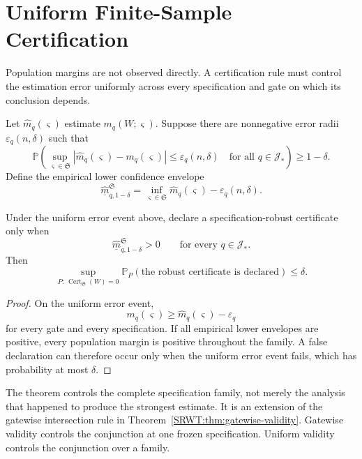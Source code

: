 \section{Uniform Finite-Sample Certification}

Population margins are not observed directly. A certification rule must
control the estimation error uniformly across every specification and gate on
which its conclusion depends.

Let \(\widehat m_q(\varsigma)\) estimate
\(m_q(W;\varsigma)\). Suppose there are nonnegative error radii
\(\varepsilon_q(n,\delta)\) such that
\[
\mathbb P\left(
\sup_{\varsigma\in\mathfrak S}
\left|
\widehat m_q(\varsigma)-m_q(\varsigma)
\right|
\leq
\varepsilon_q(n,\delta)
\quad\text{for all }q\in\mathcal J_*
\right)
\geq1-\delta.
\]
Define the empirical lower confidence envelope
\[
\boxed{
\widehat{\underline m}_{q,1-\delta}^{\mathfrak S}
=
\inf_{\varsigma\in\mathfrak S}
\widehat m_q(\varsigma)
-
\varepsilon_q(n,\delta).
}
\]


\begin{SRWTtheorem}
\label{SRWT:thm:uniform-spec-certification}
Under the uniform error event above, declare a specification-robust certificate
only when
\[
\widehat{\underline m}_{q,1-\delta}^{\mathfrak S}>0
\qquad
\text{for every }q\in\mathcal J_*.
\]
Then
\[
\boxed{
\sup_{P:\,\operatorname{Cert}_{\mathfrak S}(W)=0}
\mathbb P_P
\left(
\text{the robust certificate is declared}
\right)
\leq\delta.
}
\]
\end{SRWTtheorem}

\begin{proof}
On the uniform error event,
\[
m_q(\varsigma)
\geq
\widehat m_q(\varsigma)-\varepsilon_q
\]
for every gate and every specification. If all empirical lower envelopes are
positive, every population margin is positive throughout the family. A false
declaration can therefore occur only when the uniform error event fails, which
has probability at most \(\delta\).
\end{proof}

The theorem controls the complete specification family, not merely the
analysis that happened to produce the strongest estimate. It is an extension
of the gatewise intersection rule in Theorem~\ref{SRWT:thm:gatewise-validity}.
Gatewise validity controls the conjunction at one frozen specification.
Uniform validity controls the conjunction over a family.

